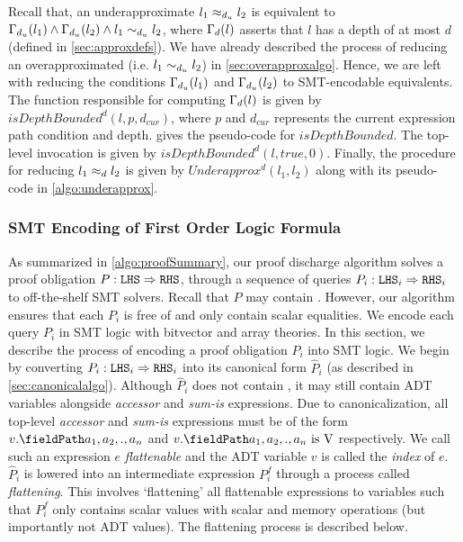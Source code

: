 Recall that, an underapproximate \recursiveRelation{} $l_1 \approx_{d_u} l_2$
is equivalent to $\Gamma_{d_u}(l_1) \land \Gamma_{d_u}(l_2) \land l_1 \sim_{d_u} l_2$,
where $\Gamma_{d}(l)$ asserts that $l$ has a depth of at most $d$ (defined in \cref{sec:approxdefs}).
We have already described the process of reducing an overapproximated \recursiveRelation{}
(i.e. $l_1 \sim_{d_u} l_2$) in \cref{sec:overapproxalgo}.
Hence, we are left with reducing the conditions $\Gamma_{d_u}(l_1)$ and $\Gamma_{d_u}(l_2)$
to SMT-encodable equivalents.
The function responsible for computing $\Gamma_{d}(l)$ is given by $isDepthBounded^d(l,p,d_{cur})$,
where $p$ and $d_{cur}$ represents the current expression path condition and depth.
 gives the pseudo-code for $isDepthBounded$.
The top-level invocation is given by $isDepthBounded^d(l,true,0)$.
Finally, the procedure for reducing $l_1 \approx_{d} l_2$ is given by $Underapprox^{d}(l_1,l_2)$
along with its pseudo-code in \cref{algo:underapprox}.




\subsubsection{SMT Encoding of First Order Logic Formula}
\label{sec:smtencoding}
As summarized in \cref{algo:proofSummary}, our proof discharge algorithm solves a proof obligation $P: {\tt LHS}{} \Rightarrow {\tt RHS}{}$,
through a sequence of queries $P_i : {\tt LHS}{}_i \Rightarrow {\tt RHS}{}_i$ to off-the-shelf SMT solvers.
Recall that $P$ may contain \recursiveRelations{}.
However, our algorithm ensures that each $P_i$ is free of \recursiveRelations{} and only contain
scalar equalities.
We encode each query $P_i$ in SMT logic with bitvector and array theories.
In this section, we describe the process of encoding a proof obligation $P_i$ into SMT logic.
We begin by converting $P_i : {\tt LHS}{}_i \Rightarrow {\tt RHS}{}_i$ into its canonical form $\hat{P}_i$
(as described in \cref{sec:canonicalalgo}).
Although $\hat{P}_i$ does not contain \recursiveRelations{}, it may still contain
ADT variables alongside {\em accessor} and {\em sum-is} expressions.
Due to canonicalization, all top-level {\em accessor} and {\em sum-is} expressions must be of the form
$\prodAccess{v}{a_1,a_2,.,a_n}$ and $\sumIs{\prodAccess{v}{a_1,a_2,.,a_n}}{\textnormal{V}}$ respectively.
We call such an expression $e$ {\em flattenable} and the ADT variable $v$ is called the {\em index} of $e$.
$\hat{P}_i$ is lowered into an intermediate expression $P_i^f$ through a process called {\em flattening}.
This involves `flattening' all flattenable expressions to variables such that
$P_i^f$ only contains scalar values with scalar and memory operations (but importantly not ADT values).
The flattening process is described below.

